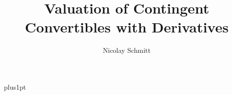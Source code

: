 \documentclass[12pt]{ociamthesis}  %
\title{Valuation of Contingent Convertibles with Derivatives}   %
\author{Nicolay Schmitt}             %
\begin{document}

\baselineskip=18pt plus1pt

\setcounter{tocdepth}{1}

\maketitle                  %


\begin{romanpages}          %
\tableofcontents            %
\listoffigures	 %
\listoftables
\end{romanpages}            %








\appendix
%

\renewcommand{\bibname}{References}
 
%
\end{document}

